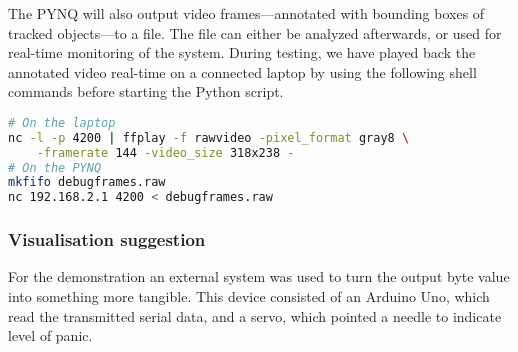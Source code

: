The PYNQ will also output video frames---annotated with bounding boxes of tracked objects---to a file. The file can either be analyzed afterwards, or used for real-time monitoring of the system. During testing, we have played back the annotated video real-time on a connected laptop by using the following shell commands before starting the Python script.

\lstset{basicstyle=\footnotesize}
\begin{lstlisting}[language=bash]
# On the laptop
nc -l -p 4200 | ffplay -f rawvideo -pixel_format gray8 \
    -framerate 144 -video_size 318x238 -
# On the PYNQ
mkfifo debugframes.raw
nc 192.168.2.1 4200 < debugframes.raw
\end{lstlisting}

\subsubsection{Visualisation suggestion}
For the demonstration an external system was used to turn the output byte value into something more tangible. This device consisted of an Arduino Uno, which read the transmitted serial data, and a servo, which pointed a needle to indicate level of panic. 

